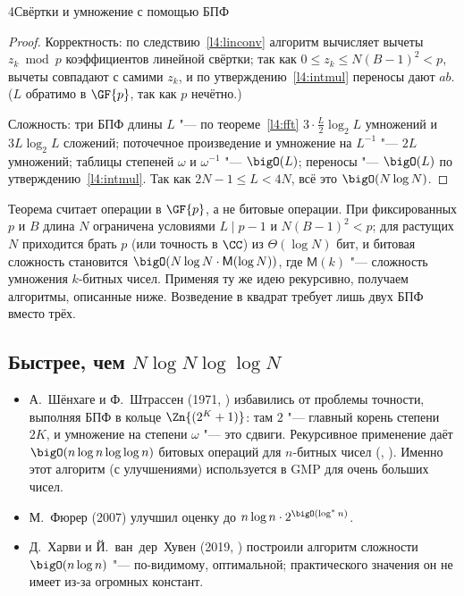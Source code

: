 \begin{lecture}{4}{Свёртки и умножение с помощью БПФ}
\begin{proof}
Корректность: по следствию~\ref{l4:linconv} алгоритм вычисляет вычеты $z_k \bmod p$
коэффициентов линейной свёртки; так как $0 \le z_k \le N(B-1)^2 < p$, вычеты совпадают с самими
$z_k$, и по утверждению~\ref{l4:intmul} переносы дают $ab$. ($L$ обратимо в $\GF{p}$, так как
$p$ нечётно.)

Сложность: три БПФ длины $L$ "--- по теореме~\ref{l4:fft} $3 \cdot \frac L2 \log_2 L$ умножений и
$3 L \log_2 L$ сложений; поточечное произведение и умножение на $L^{-1}$ "--- $2L$ умножений;
таблицы степеней $\omega$ и $\omega^{-1}$ "--- $\bigO(L)$; переносы "--- $\bigO(L)$ по
утверждению~\ref{l4:intmul}. Так как $2N - 1 \le L < 4N$, всё это $\bigO(N \log N)$.
\end{proof}

\begin{remark}
Теорема считает операции в $\GF{p}$, а не битовые операции. При фиксированных $p$ и $B$
длина $N$ ограничена условиями $L \mid p - 1$ и $N(B-1)^2 < p$; для растущих $N$ приходится
брать $p$ (или точность в $\CC$) из $\Theta(\log N)$ бит, и битовая сложность становится
$\bigO(N \log N \cdot \mathsf M(\log N))$, где $\mathsf M(k)$ "--- сложность умножения $k$-битных
чисел. Применяя ту же идею рекурсивно, получаем алгоритмы, описанные ниже. Возведение
в квадрат требует лишь двух БПФ вместо трёх.
\end{remark}

\subsection{Быстрее, чем \texorpdfstring{$N \log N \log\log N$}{N log N log log N}}

\begin{itemize}
  \item А.~Шёнхаге и Ф.~Штрассен (1971, \cite{schonhage-strassen}) избавились от проблемы
    точности, выполняя БПФ в кольце $\Zn{(2^K + 1)}$: там $2$ "--- главный корень степени $2K$, и
    умножение на степени $\omega$ "--- это сдвиги. Рекурсивное применение даёт
    $\bigO(n \log n \log\log n)$ битовых операций для $n$-битных чисел
    (\cite[разд.~9.5.6]{crandall-pomerance}, \cite[гл.~8]{von-zur-gathen}). Именно этот алгоритм
    (с улучшениями) используется в GMP для очень больших чисел.
  \item М.~Фюрер (2007) улучшил оценку до $n \log n \cdot 2^{\bigO(\log^* n)}$.
  \item Д.~Харви и Й.~ван~дер~Хувен (2019, \cite{harvey-van-der-hoeven}) построили алгоритм
    сложности $\bigO(n \log n)$ "--- по-видимому, оптимальной; практического значения он
    не имеет из-за огромных констант.
\end{itemize}


\end{lecture}
